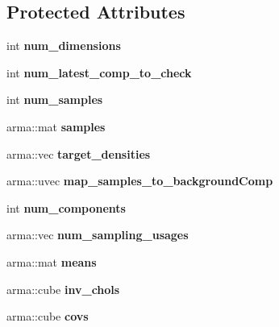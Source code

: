 \subsection*{Protected Attributes}
\begin{DoxyCompactItemize}
\item 
int {\bfseries num\+\_\+dimensions}\hypertarget{classSampleDatabase_ad04c78bca974757aa2728460b9c8a836}{}\label{classSampleDatabase_ad04c78bca974757aa2728460b9c8a836}

\item 
int {\bfseries num\+\_\+latest\+\_\+comp\+\_\+to\+\_\+check}\hypertarget{classSampleDatabase_a07a7cd90ae7f6b9faa2f7ed228ea610b}{}\label{classSampleDatabase_a07a7cd90ae7f6b9faa2f7ed228ea610b}

\item 
int {\bfseries num\+\_\+samples}\hypertarget{classSampleDatabase_ac708e9898d20f820957afcb69c282618}{}\label{classSampleDatabase_ac708e9898d20f820957afcb69c282618}

\item 
arma\+::mat {\bfseries samples}\hypertarget{classSampleDatabase_aa1f521741803183aec5140167d9fbf36}{}\label{classSampleDatabase_aa1f521741803183aec5140167d9fbf36}

\item 
arma\+::vec {\bfseries target\+\_\+densities}\hypertarget{classSampleDatabase_a37680a91b533575f3d9adbe80b5df104}{}\label{classSampleDatabase_a37680a91b533575f3d9adbe80b5df104}

\item 
arma\+::uvec {\bfseries map\+\_\+samples\+\_\+to\+\_\+background\+Comp}\hypertarget{classSampleDatabase_a6dee618f017df3ce8cfc31b097310508}{}\label{classSampleDatabase_a6dee618f017df3ce8cfc31b097310508}

\item 
int {\bfseries num\+\_\+components}\hypertarget{classSampleDatabase_aa92541bbb40b1092d8f88907cd1f69b5}{}\label{classSampleDatabase_aa92541bbb40b1092d8f88907cd1f69b5}

\item 
arma\+::vec {\bfseries num\+\_\+sampling\+\_\+usages}\hypertarget{classSampleDatabase_aa410414e9e1a2924db3bd9d7c75f22b0}{}\label{classSampleDatabase_aa410414e9e1a2924db3bd9d7c75f22b0}

\item 
arma\+::mat {\bfseries means}\hypertarget{classSampleDatabase_abf97526d7e8164c9f29b56ebc3ee3bcc}{}\label{classSampleDatabase_abf97526d7e8164c9f29b56ebc3ee3bcc}

\item 
arma\+::cube {\bfseries inv\+\_\+chols}\hypertarget{classSampleDatabase_a888d421279a6dff04d77d10551e48861}{}\label{classSampleDatabase_a888d421279a6dff04d77d10551e48861}

\item 
arma\+::cube {\bfseries covs}\hypertarget{classSampleDatabase_a585cd3b7db81be3e053d56e6a490b802}{}\label{classSampleDatabase_a585cd3b7db81be3e053d56e6a490b802}

\end{DoxyCompactItemize}


